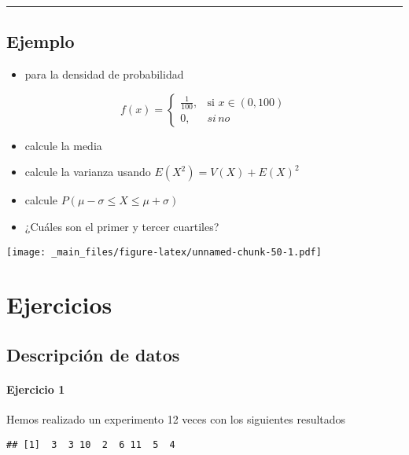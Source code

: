 \documentclass[
]{book}
\providecommand{\tightlist}{%
  \setlength{\itemsep}{0pt}\setlength{\parskip}{0pt}}
\begin{document}
\begin{center}\rule{0.5\linewidth}{0.5pt}\end{center}

\hypertarget{ejemplo-8}{%
\section{Ejemplo}\label{ejemplo-8}}

\begin{itemize}
\tightlist
\item
  para la densidad de probabilidad
\end{itemize}

\[
    f(x)= 
\begin{cases}
    \frac{1}{100},& \text{si } x\in (0,100)\\
    0,& si \, no 
\end{cases}
\]

\begin{itemize}
\tightlist
\item
  calcule la media
\item
  calcule la varianza usando \(E(X^2)=V(X)+E(X)^2\)
\item
  calcule \(P(\mu-\sigma\leq X \leq \mu+\sigma)\)
\item
  ¿Cuáles son el primer y tercer cuartiles?
\end{itemize}

\texttt{[image: \_main\_files/figure-latex/unnamed-chunk-50-1.pdf]}

\hypertarget{ejercicios}{%
\chapter{Ejercicios}\label{ejercicios}}

\hypertarget{descripciuxf3n-de-datos-1}{%
\section{Descripción de datos}\label{descripciuxf3n-de-datos-1}}

\hypertarget{ejercicio-1}{%
\subsubsection{Ejercicio 1}\label{ejercicio-1}}

Hemos realizado un experimento 12 veces con los siguientes resultados

\begin{verbatim}
## [1]  3  3 10  2  6 11  5  4
\end{verbatim}
\end{document}
